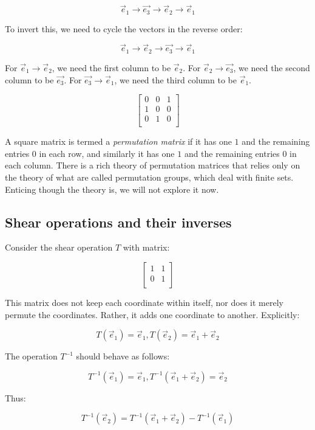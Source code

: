 \documentclass[10pt]{amsart}
\begin{document}
$$\vec{e}_1 \to \vec{e_3} \to \vec{e}_2 \to \vec{e}_1$$

To invert this, we need to cycle the vectors in the reverse order:

$$\vec{e}_1 \to \vec{e}_2 \to \vec{e_3} \to \vec{e}_1$$

For $\vec{e}_1 \to \vec{e}_2$, we need the first column to be
$\vec{e}_2$. For $\vec{e}_2 \to \vec{e_3}$, we need the second column
to be $\vec{e_3}$. For $\vec{e_3} \to \vec{e}_1$, we need the third
column to be $\vec{e}_1$.

$$\left[\begin{matrix} 0 & 0 & 1 \\ 1 & 0 & 0 \\ 0 & 1 & 0 \\\end{matrix}\right]$$

A square matrix is termed a {\em permutation matrix} if it has one $1$
and the remaining entries $0$ in each row, and similarly it has one
$1$ and the remaining entries $0$ in each column. There is a rich
theory of permutation matrices that relies only on the theory of what
are called permutation groups, which deal with finite sets. Enticing
though the theory is, we will not explore it now.

\subsection{Shear operations and their inverses}

Consider the shear operation $T$ with matrix:

$$\left[\begin{matrix} 1 & 1 \\ 0 & 1 \\\end{matrix} \right]$$

This matrix does not keep each coordinate within itself, nor does it
merely permute the coordinates. Rather, it adds one coordinate to another. Explicitly:

$$T(\vec{e}_1) = \vec{e}_1, T(\vec{e}_2) = \vec{e}_1 + \vec{e}_2$$

The operation $T^{-1}$ should behave as follows:

$$T^{-1}(\vec{e}_1) = \vec{e}_1, T^{-1}(\vec{e}_1 + \vec{e}_2) = \vec{e}_2$$

Thus:

$$T^{-1}(\vec{e}_2) = T^{-1}(\vec{e}_1 + \vec{e}_2) - T^{-1}(\vec{e}_1)$$
\end{document}
